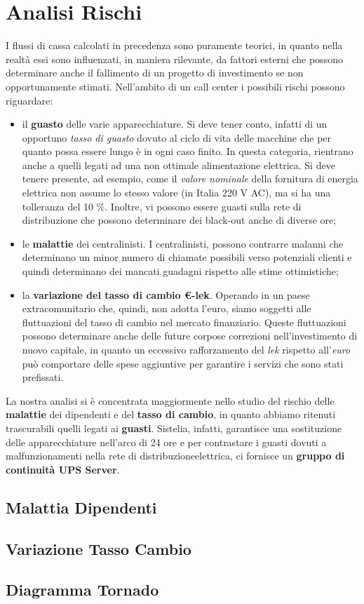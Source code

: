 \chapter[Analisi Rischi]{Analisi Rischi}
I flussi di cassa calcolati in precedenza sono puramente teorici, in quanto nella realtà essi sono influenzati, in maniera rilevante, da fattori esterni che possono determinare anche il fallimento di un progetto di investimento se non opportunamente stimati.
Nell'ambito di un call center i possibili rischi possono riguardare:
\begin{itemize}
\item il \textbf{guasto} delle varie apparecchiature. Si deve tener conto, infatti di un opportuno \textit{tasso di guasto} dovuto al ciclo di vita delle macchine che per quanto possa essere lungo è in ogni caso finito. In questa categoria, rientrano anche a quelli legati ad una non ottimale alimentazione elettrica. Si deve tenere presente, ad esempio, come il \textit{valore nominale} della fornitura di energia elettrica non assume lo stesso valore (in Italia 220 V AC), ma si ha una tolleranza del 10 \%\cite{norma_cei}. Inoltre, vi possono essere guasti sulla rete di distribuzione che possono determinare dei black-out anche di diverse ore;
\item le \textbf{malattie} dei centralinisti. I centralinisti, possono contrarre malanni che determinano un minor numero di chiamate possibili verso potenziali clienti e quindi determinano dei mancati guadagni rispetto alle stime ottimistiche;
\item la \textbf{variazione del tasso di cambio \euro -lek}. Operando in un paese extracomunitario che, quindi, non adotta l'euro, siamo soggetti alle fluttuazioni del tasso di cambio nel mercato finanziario. Queste fluttuazioni possono determinare anche delle future corpose correzioni nell'investimento di nuovo capitale, in quanto un eccessivo rafforzamento del \textit{lek} rispetto all'\textit{euro} può comportare delle spese aggiuntive per garantire i servizi che sono stati prefissati.  
\end{itemize} 
La nostra analisi si è concentrata maggiormente nello studio del rischio delle \textbf{malattie} dei dipendenti e del \textbf{tasso di cambio}, in quanto abbiamo ritenuti trascurabili quelli legati ai \textbf{guasti}. Sistelia, infatti, garantisce una sostituzione delle apparecchiature nell'arco di 24 ore e per contrastare i guasti dovuti a malfunzionamenti nella rete di distribuzioneelettrica, ci fornisce un \textbf{gruppo di continuità \ac{UPS} Server}.

\section[Malattia Dipendenti]{Malattia Dipendenti}
	

\section[Variazione Tasso Cambio]{Variazione Tasso Cambio}
		
	
\section[Diagramma Tornado]{Diagramma Tornado}	
	